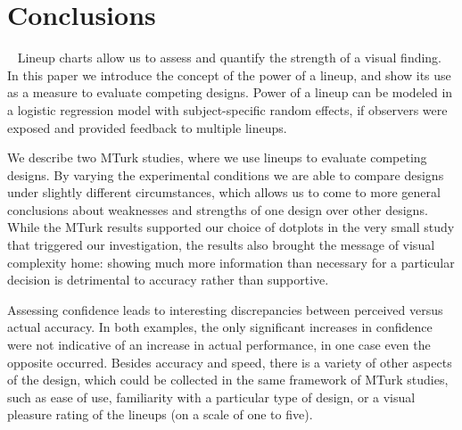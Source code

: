 \section{Conclusions}~\label{conclusions}
Lineup charts allow us to assess and quantify the strength of a visual finding. In this paper we introduce the concept of  the power of a lineup, and show its use as a measure to evaluate competing designs. 
Power of a lineup can be modeled in a logistic regression model with subject-specific random effects, if observers were exposed and provided feedback to multiple lineups. 

We describe two MTurk studies, where we use lineups to  evaluate competing designs. By varying the experimental conditions we are able to compare designs under slightly different  circumstances, which allows us to come to more general conclusions about weaknesses and strengths of one design over other designs.  While the MTurk results supported our choice of dotplots in the very small study that triggered our investigation, the results also brought the message of visual complexity home: showing much more information than necessary for a particular decision is detrimental to accuracy rather than supportive.

Assessing confidence leads to interesting discrepancies between perceived versus actual accuracy. In both examples, the only significant increases in confidence were not indicative of an increase in actual performance, in one case even the opposite occurred. 
Besides accuracy and speed, there is a variety of other aspects of the design, which could be collected in  the same framework of  MTurk studies, such as ease of use, familiarity with a particular type of design, or a visual pleasure rating of the lineups  (on a scale of one to five).




